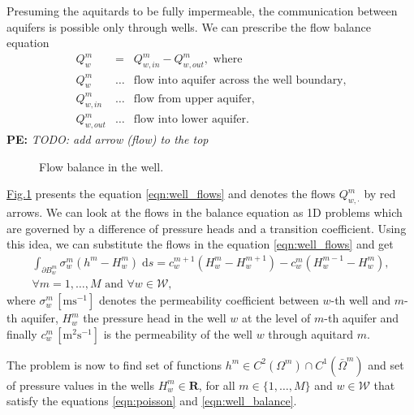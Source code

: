 \documentclass[preprint,12pt]{elsarticle}
\newcommand{\fig}[1]{\hyperref[#1]{Fig.\ref{#1}}}
\newcommand{\figpath}{../graphics/}
\newcommand{\dd}{\; \mathrm{d}}
\newcommand{\R}{\mathbf{R}}
\newcommand{\notePE}[1]{{\color{Orange} \textbf{PE: } \textit{#1}}}
\begin{document}
Presuming the aquitards to be fully impermeable, the communication between aquifers is possible only through 
wells. We can prescribe the flow balance equation 
\begin{eqnarray}
  Q^m_w &=& Q^m_{w,in} - Q^m_{w,out}, \textrm{ where} \label{eqn:well_flows} \\
  Q^m_w &\ldots& \textrm{flow into aquifer across the well boundary,} \nonumber\\
  Q^m_{w,in} &\ldots& \textrm{flow from upper aquifer,} \nonumber\\
  Q^m_{w,out} &\ldots& \textrm{flow into lower aquifer.} \nonumber
\end{eqnarray}
\notePE{TODO: add arrow (flow) to the top}
\begin{figure}[!htb]
  \begin{center}         
    \def\svgwidth{0.5\textwidth}
    
  \end{center}
  \caption{Flow balance in the well.}
  \label{fig:well_flows}
\end{figure}

\fig{fig:well_flows} presents the equation \eqref{eqn:well_flows} and denotes the flows $Q^m_{w,\cdot}$ by red arrows.
We can look at the flows in the balance equation as 1D problems which are governed by a difference of pressure
heads and a transition coefficient. Using this idea, we can substitute the flows in the equation 
\eqref{eqn:well_flows} and get
\begin{eqnarray} 
\int_{\partial B_w^m}\sigma_w^m \left(h^m - H_w^m\right) \dd s
  = c_w^{m+1}\left( H^m_w-H_w^{m+1}\right) - c^m_w\left( H^{m-1}_w-H^m_w \right), \label{eqn:well_balance} \\
 \forall m=1,\dots,M \textrm{ and } \forall w\in\mathcal{W}, \nonumber
\end{eqnarray}
where $\sigma^m_w\, [\textrm{m}\textrm{s}^{-1}]$ denotes the permeability coefficient between $w$-th well and 
$m$-th aquifer, $H_w^m$ the pressure head in the well $w$ at the level of $m$-th aquifer and finally 
$c^m_w\, [\textrm{m}^2\textrm{s}^{-1}]$ is the permeability of the well $w$ through aquitard $m$.

The problem is now to find set of functions $h^m\in C^2(\Omega^m)\cap{C}^1(\bar\Omega^m)$ and set of pressure 
values in the wells $H^m_w\in\R$, for all $m\in\{1,\ldots,M\}$ and $w\in\mathcal{W}$ that
satisfy the equations \eqref{eqn:poisson} and \eqref{eqn:well_balance}.
\end{document}
